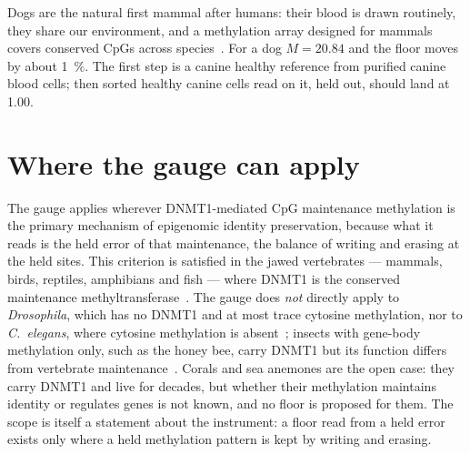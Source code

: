 Dogs are the natural first mammal after humans: their blood is drawn routinely, they share our environment, and a
methylation array designed for mammals covers conserved CpGs across species~\cite{Arneson2022}. For a dog $M=20.84$ and the
floor moves by about 1~\%. The first step is a canine healthy reference from purified canine blood cells; then sorted healthy
canine cells read on it, held out, should land at 1.00. \prediction

\section{Where the gauge can apply}

The gauge applies wherever DNMT1-mediated CpG maintenance methylation is the primary mechanism of epigenomic identity
preservation, because what it reads is the held error of that maintenance, the balance of writing and erasing at the held sites. This criterion is satisfied in the jawed vertebrates ---
mammals, birds, reptiles, amphibians and fish --- where DNMT1 is the conserved maintenance methyltransferase~\cite{Lyko2018}.
\observed{} The gauge does \emph{not} directly apply to \emph{Drosophila}, which has no DNMT1 and at most trace cytosine
methylation, nor to \emph{C.~elegans}, where cytosine methylation is absent~\cite{Lyko2018}; insects with gene-body
methylation only, such as the honey bee, carry DNMT1 but its function differs from vertebrate maintenance~\cite{Lyko2010}.
\observed{} Corals and sea anemones are the open case: they carry DNMT1 and live for decades, but whether their methylation
maintains identity or regulates genes is not known, and no floor is proposed for them. \openprob{} The scope is itself a
statement about the instrument: a floor read from a held error exists only where a held methylation pattern is kept by writing and erasing. \interp
